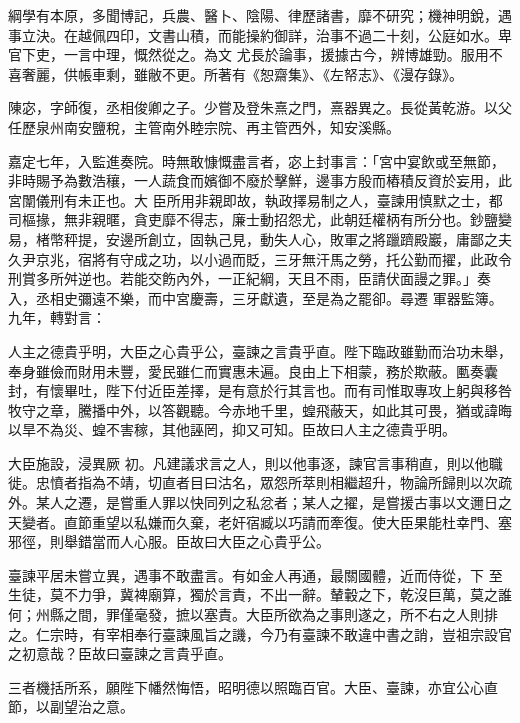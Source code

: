 \begin{pinyinscope}
 綱學有本原，多聞博記，兵農、醫卜、陰陽、律歷諸書，靡不研究；機神明銳，遇事立決。在越佩四印，文書山積，而能操約御詳，治事不過二十刻，公庭如水。卑官下吏，一言中理，慨然從之。為文
 尤長於論事，援據古今，辨博雄勁。服用不喜奢麗，供帳車剩，雖敝不更。所著有《恕齋集》、《左帑志》、《漫存錄》。



 陳宓，字師復，丞相俊卿之子。少嘗及登朱熹之門，熹器異之。長從黃乾游。以父任歷泉州南安鹽稅，主管南外睦宗院、再主管西外，知安溪縣。



 嘉定七年，入監進奏院。時無敢慷慨盡言者，宓上封事言：「宮中宴飲或至無節，非時賜予為數浩穰，一人蔬食而嬪御不廢於擊鮮，邊事方殷而樁積反資於妄用，此宮闈儀刑有未正也。大
 臣所用非親即故，執政擇易制之人，臺諫用慎默之士，都司樞掾，無非親暱，貪吏靡不得志，廉士動招怨尤，此朝廷權柄有所分也。鈔鹽變易，楮幣秤提，安邊所創立，固執己見，動失人心，敗軍之將躐躋殿巖，庸鄙之夫久尹京兆，宿將有守成之功，以小過而貶，三牙無汗馬之勞，托公勤而擢，此政令刑賞多所舛逆也。若能交飭內外，一正紀綱，天且不雨，臣請伏面謾之罪。」奏入，丞相史彌遠不樂，而中宮慶壽，三牙獻遺，至是為之罷卻。尋遷
 軍器監簿。九年，轉對言：



 人主之德貴乎明，大臣之心貴乎公，臺諫之言貴乎直。陛下臨政雖勤而治功未舉，奉身雖儉而財用未豐，愛民雖仁而實惠未遍。良由上下相蒙，務於欺蔽。匭奏囊封，有懷畢吐，陛下付近臣差擇，是有意於行其言也。而有司惟取專攻上躬與移咎牧守之章，騰播中外，以答觀聽。今赤地千里，蝗飛蔽天，如此其可畏，猶或諱晦以旱不為災、蝗不害稼，其他誣罔，抑又可知。臣故曰人主之德貴乎明。



 大臣施設，浸異厥
 初。凡建議求言之人，則以他事逐，諫官言事稍直，則以他職徙。忠憤者指為不靖，切直者目曰沽名，眾怨所萃則相繼超升，物論所歸則以次疏外。某人之遷，是嘗重人罪以快同列之私忿者；某人之擢，是嘗援古事以文邇日之天變者。直節重望以私嫌而久棄，老奸宿臧以巧請而牽復。使大臣果能杜幸門、塞邪徑，則舉錯當而人心服。臣故曰大臣之心貴乎公。



 臺諫平居未嘗立異，遇事不敢盡言。有如金人再通，最關國體，近而侍從，下
 至生徒，莫不力爭，冀裨廟算，獨於言責，不出一辭。輦轂之下，乾沒巨萬，莫之誰何；州縣之間，罪僅毫發，摭以塞責。大臣所欲為之事則遂之，所不右之人則排之。仁宗時，有宰相奉行臺諫風旨之譏，今乃有臺諫不敢違中書之誚，豈祖宗設官之初意哉？臣故曰臺諫之言貴乎直。



 三者機括所系，願陛下幡然悔悟，昭明德以照臨百官。大臣、臺諫，亦宜公心直節，以副望治之意。




\end{pinyinscope}

